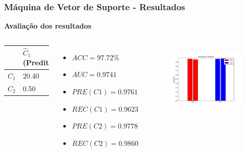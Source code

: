 \documentclass{beamer}
\begin{document}
\begin{frame}
\frametitle{Máquina de Vetor de Suporte - Resultados}
\textbf{Avaliação dos resultados}
\begin{columns}[c] 
\begin{table}
\begin{tabular}{l l l}
\toprule
 & \textbf{$\hat{C}_1$ (Predita)} & \textbf{$\hat{C}_2$(Predita)}\\
\midrule
$C_1$ & 20.40 & 0.80 \\
$C_2$ & 0.50  & 35.20\\ 
\bottomrule
\end{tabular}
\begin{itemize}
\item $ACC = 97.72 \%$
\item $AUC = 0.9741  $
\item $PRE(C1) = 0.9761$
\item $REC(C1) = 0.9623$
\item $PRE(C2) = 0.9778$
\item $REC(C2) = 0.9860$
\end{itemize}
\end{table}

\begin{figure}[H]
\centering
  \includegraphics[width=\linewidth]{../img/svm.png}
  \label{fig:percep}
\end{figure}%

\end{columns}
\end{frame}
\end{document}
